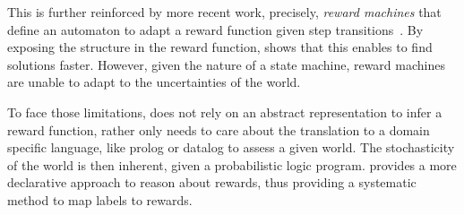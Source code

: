 %
%
This is further reinforced by more recent work, precisely, \emph{reward machines} that define an automaton to adapt a reward function given 
step transitions~\cite{icarte2022reward}. By exposing the structure in the reward function, \cite{icarte2022reward} shows that this enables to find solutions faster. 
%
%
However, given the nature of a state machine, reward machines are unable to adapt to the uncertainties of the world. 

%
%
To face those limitations, \dio{} does not rely on an abstract representation to infer a reward function, rather only needs 
to care about the translation to a domain specific language, like prolog or datalog to assess a given world. 
The stochasticity of the world is then inherent, given a probabilistic logic program.
\dio{} provides a more declarative approach to reason about rewards, thus providing a systematic method to map 
labels to rewards. 

